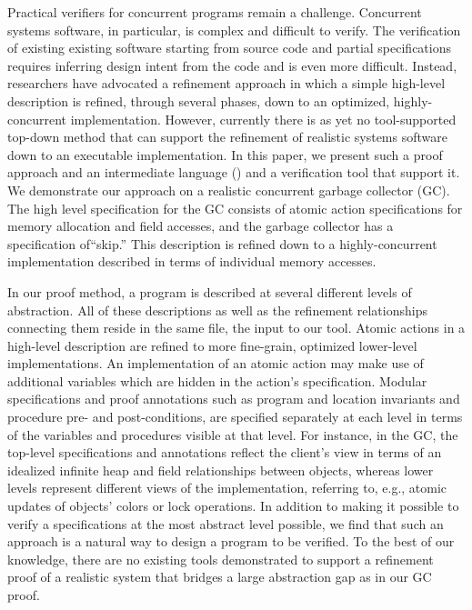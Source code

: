 Practical verifiers for concurrent programs remain a challenge.  
Concurrent systems software, in particular, is complex and difficult to verify. 
The verification of existing existing software starting from source code and partial specifications requires inferring design intent from the code and is even more difficult. 
Instead, researchers have advocated a refinement approach in which a simple high-level description is refined, through several phases, down to an optimized, highly-concurrent implementation.  However, currently there is as yet no tool-supported top-down method that can support the refinement of realistic systems software down to an executable implementation.  In this paper, we present such a proof approach and an intermediate language (\civl) and a verification tool that support it.  We demonstrate our approach on a realistic concurrent garbage collector (GC). The high level specification for the GC consists of atomic action specifications for memory allocation and field accesses, and the garbage collector has a specification of``skip.'' This description is refined down to a highly-concurrent implementation described in terms of individual memory accesses.

In our proof method, a program is described at several different levels of abstraction. 
All of these descriptions as well as the refinement relationships connecting them reside in the same \civl file, the input to our tool. 
Atomic actions in a high-level description are refined to more fine-grain, optimized lower-level implementations. An implementation of an atomic action may make use of additional variables which are hidden in the action's specification. 
Modular specifications and proof annotations such as program and location invariants and procedure pre- and post-conditions, are specified separately at each level in terms of the variables and procedures visible at that level. For instance, in the GC, the top-level specifications and annotations reflect the client's view in terms of an idealized infinite heap and field relationships between objects, 
 whereas lower levels represent different views of the implementation, referring to, e.g., atomic updates of objects' colors or lock operations.
In addition to making it possible to verify a specifications at the most abstract level possible, we find that such an approach is a natural way to design a program to be verified. 
To the best of our knowledge, there are no existing tools demonstrated to support a refinement proof of a realistic system that bridges a large abstraction gap as in our GC proof. 

